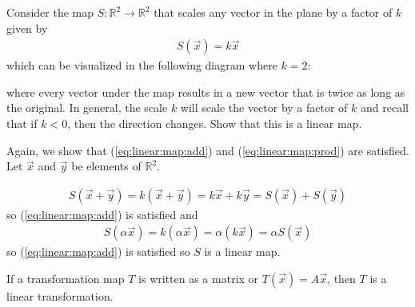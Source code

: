 \begin{example} \label{ex:scale:map}  
Consider the map $S: \mathbb{R}^2 \rightarrow \mathbb{R}^2$  that scales any vector in the plane by a factor of $k$ given by 
\begin{align*}
S(\vec{x}) = k \vec{x}
\end{align*}
which can be visualized in the following diagram where $k=2$:

\begin{center}
\end{center}
where every vector under the map results in a new vector that is twice as long as the original.  In general, the scale $k$ will scale the vector by a factor of $k$ and recall that if $k<0$, then the direction changes.    Show that this is a linear map.

\solution

Again, we show that (\ref{eq:linear:map:add}) and (\ref{eq:linear:map:prod}) are satisfied.   Let $\vec{x}$ and $\vec{y}$ be elements of $\mathbb{R}^2$.  

\begin{align*}
S(\vec{x}+\vec{y}) = k(\vec{x}+\vec{y}) = k\vec{x} + k \vec{y} = S(\vec{x}) + S(\vec{y}) 
\end{align*} so (\ref{eq:linear:map:add}) is satisfied and 
\begin{align*}
S(\alpha \vec{x}) = k (\alpha \vec{x} ) = \alpha (k \vec{x}) = \alpha S(\vec{x})
\end{align*}
so (\ref{eq:linear:map:add}) is satisfied so $S$ is a linear map.  

\end{example}




\begin{theorem} \label{thm:matrix:linear:trans}
If a transformation map $T$ is written as a matrix or $T(\vec{x}) = A\vec{x}$, then $T$ is a linear transformation.  
\end{theorem}

